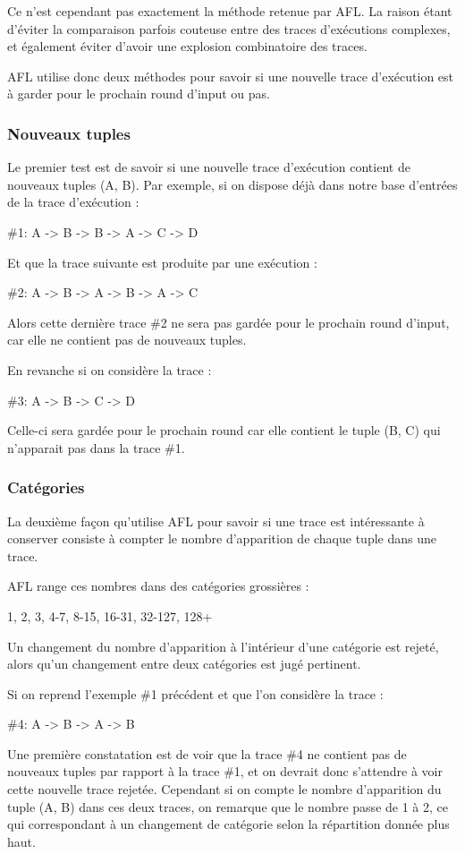 Ce n'est cependant pas exactement la méthode retenue par AFL. La raison
étant d'éviter la comparaison parfois couteuse entre des traces
d'exécutions complexes, et également éviter d'avoir une explosion
combinatoire des traces.

AFL utilise donc deux méthodes pour savoir si une nouvelle trace d'exécution
est à garder pour le prochain round d'input ou pas.

\subsubsection{Nouveaux tuples}
Le premier test est de savoir si une nouvelle trace d'exécution contient de
nouveaux tuples (A, B). Par exemple, si on dispose déjà dans notre base
d'entrées de la trace d'exécution :

\#1: A -> B -> B -> A -> C -> D

Et que la trace suivante est produite par une exécution :

\#2: A -> B -> A -> B -> A -> C

Alors cette dernière trace \#2 ne sera pas gardée pour le prochain round
d'input, car elle ne contient pas de nouveaux tuples.

En revanche si on considère la trace :

\#3: A -> B -> C -> D

Celle-ci sera gardée pour le prochain round car elle contient le tuple
(B, C) qui n'apparait pas dans la trace \#1.

\subsubsection{Catégories}

La deuxième façon qu'utilise AFL pour savoir si une trace est
intéressante à conserver consiste à compter le nombre d'apparition de
chaque tuple dans une trace.

AFL range ces nombres dans des catégories grossières :

1, 2, 3, 4-7, 8-15, 16-31, 32-127, 128+

Un changement du nombre d'apparition à l'intérieur d'une catégorie
est rejeté, alors qu'un changement entre deux catégories est jugé
pertinent.

Si on reprend l'exemple \#1 précédent et que l'on considère la trace :

\#4: A -> B -> A -> B

Une première constatation est de voir que la trace \#4 ne contient pas de
nouveaux tuples par rapport à la trace \#1, et on devrait donc s'attendre
à voir cette nouvelle trace rejetée. Cependant si on compte le nombre
d'apparition du tuple (A, B) dans ces deux traces, on remarque que le
nombre passe de 1 à 2, ce qui correspondant à un changement de catégorie
selon la répartition donnée plus haut.

